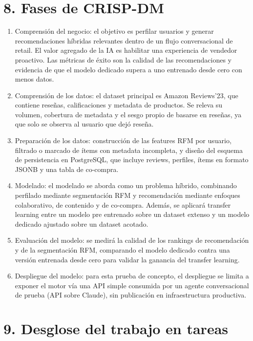 \documentclass[
11pt, %
]{charter}
\begin{document}
\section{8. Fases de CRISP-DM}

\begin{enumerate}
  \item Comprensión del negocio: el objetivo es perfilar usuarios y generar recomendaciones híbridas relevantes dentro de un flujo conversacional de retail. El valor agregado de la IA es habilitar una experiencia de vendedor proactivo. Las métricas de éxito son la calidad de las recomendaciones y evidencia de que el modelo dedicado supera a uno entrenado desde cero con menos datos.
  \item Comprensión de los datos: el dataset principal es Amazon Reviews'23, que contiene reseñas, calificaciones y metadata de productos. Se releva su volumen, cobertura de metadata y el sesgo propio de basarse en reseñas, ya que solo se observa al usuario que dejó reseña.
  \item Preparación de los datos: construcción de las features RFM por usuario, filtrado o marcado de ítems con metadata incompleta, y diseño del esquema de persistencia en PostgreSQL, que incluye reviews, perfiles, ítems en formato JSONB y una tabla de co-compra.
  \item Modelado: el modelado se aborda como un problema híbrido, combinando perfilado mediante segmentación RFM y recomendación mediante enfoques colaborativo, de contenido y de co-compra. Además, se aplicará transfer learning entre un modelo pre entrenado sobre un dataset extenso y un modelo dedicado ajustado sobre un dataset acotado.
  \item Evaluación del modelo: se medirá la calidad de los rankings de recomendación y de la segmentación RFM, comparando el modelo dedicado contra una versión entrenada desde cero para validar la ganancia del transfer learning.
  \item Despliegue del modelo: para esta prueba de concepto, el despliegue se limita a exponer el motor vía una API simple consumida por un agente conversacional de prueba (API sobre Claude), sin publicación en infraestructura productiva.
\end{enumerate}

\section{9. Desglose del trabajo en tareas}
\label{sec:wbs}
\end{document}
